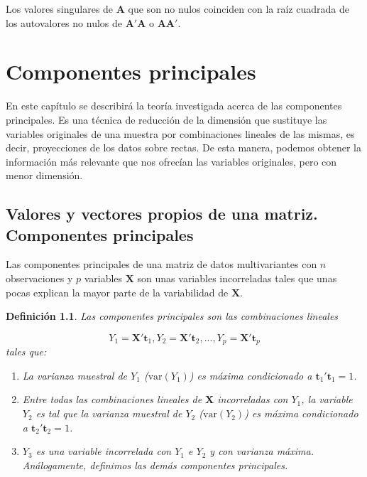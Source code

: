 \documentclass[tfg,cienciasbased,lot,lof,covers,final,overleaf,nocopyright]{tfgtfmthesisuam}
\newtheorem{defi}{Definición}[chapter]
\begin{document}
Los valores singulares de $\mathbf{A}$ que son no nulos coinciden con la raíz cuadrada de los autovalores no nulos de $\mathbf{A'A}$ o $\mathbf{AA'}$.

\chapter{Componentes principales}
En este capítulo se describirá la teoría investigada acerca de las componentes principales. Es una técnica de reducción de la dimensión que sustituye las variables originales de una muestra por combinaciones lineales de las mismas, es decir, proyecciones de los datos sobre rectas. De esta manera, podemos obtener la información más relevante que nos ofrecían las variables originales, pero con menor dimensión.

\section{Valores y vectores propios de una matriz. Componentes principales}
Las componentes principales de una matriz de datos multivariantes con $n$ observaciones y $p$ variables $\mathbf{X}$ son unas variables incorreladas tales que unas pocas explican la mayor parte de la variabilidad de $\mathbf{X}$.
\begin{defi}
    Las componentes principales son las combinaciones lineales
    
    \begin{equation*}
        Y_1 = \mathbf{X't}_1, Y_2 = \mathbf{X't}_2, ..., Y_p = \mathbf{X't}_p
    \end{equation*}
    tales que:
    \begin{enumerate}
        \item La varianza muestral de $Y_1$ ($\mbox{var}(Y_1)$) es máxima condicionado a $\mathbf{t}_1'\mathbf{t}_1 = 1$.
        \item Entre todas las combinaciones lineales de $\mathbf{X}$ incorreladas con $Y_1$, la variable $Y_2$ es tal que la varianza muestral de $Y_2$ ($\mbox{var}(Y_2)$) es máxima condicionado a $\mathbf{t}_2'\mathbf{t}_2 = 1$.
        \item $Y_3$ es una variable incorrelada con $Y_1$ e $Y_2$ y con varianza máxima. Análogamente, definimos las demás componentes principales.
    \end{enumerate}
\end{defi}
\end{document}
